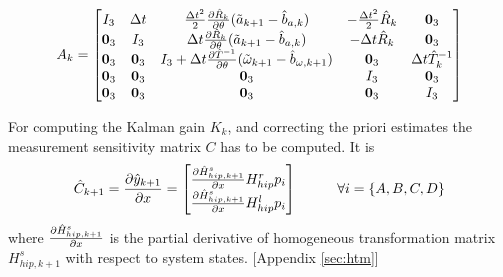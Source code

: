 \begin{equation}
    A_k = \begin{bmatrix}
    I_3 &\Delta t &\frac{\Delta t^2}{2} \frac{\partial {\hat{R}_k}}{\partial {\theta}}(\tilde{a}_{k+1} - \hat{b}_{a,k} ) &-\frac{\Delta t^2}{2} \hat{R}_k &\textbf{0}_3 \\
    \textbf{0}_3 &I_3  &\Delta t \frac{\partial {\hat{R}_k}}{\partial {\theta}}(\tilde{a}_{k+1} - \hat{b}_{a,k} ) &-\Delta t\hat{R}_k &\textbf{0}_3\\
    \textbf{0}_3  &\textbf{0}_3 &I_3 + \Delta t \frac{\partial {\hat{T}^{-1}}}{\partial {\theta}}(\tilde{\omega}_{k+1} - \hat{b}_{\omega,k+1}) &\textbf{0}_3 &\Delta t \hat{T}_k^{-1}\\
    \textbf{0}_3  &\textbf{0}_3  &\textbf{0}_3  &I_3 &\textbf{0}_3 \\
    \textbf{0}_3  &\textbf{0}_3  &\textbf{0}_3  &\textbf{0}_3 &I_3
    \end{bmatrix}
\end{equation}

For computing the Kalman gain $K_k$, and correcting the priori estimates the measurement sensitivity matrix $C$ has to be computed. It is 
\begin{equation}
        \hat{C}_{k+1} = \frac{\partial {\hat{y}_{k+1}}}{\partial {x}} = 
	\begin{bmatrix}		        
        \frac{\partial {\hat{H}^{s}_{hip,k+1}}}{\partial {x}} H_{hip}^r p_i\\
		\frac{\partial {\hat{H}^{s}_{hip,k+1}}}{\partial {x}} H_{hip}^l p_i\\
    \end{bmatrix}
         \hspace{1cm} \forall i=\{A,B,C,D\} 
\end{equation}
where $\frac{\partial {\hat{H}^s_{hip,k+1}}}{\partial {x}}$ is the partial derivative of homogeneous transformation matrix $H_{hip,k+1}^s$ with respect to system states. [Appendix \ref{sec:htm}]


